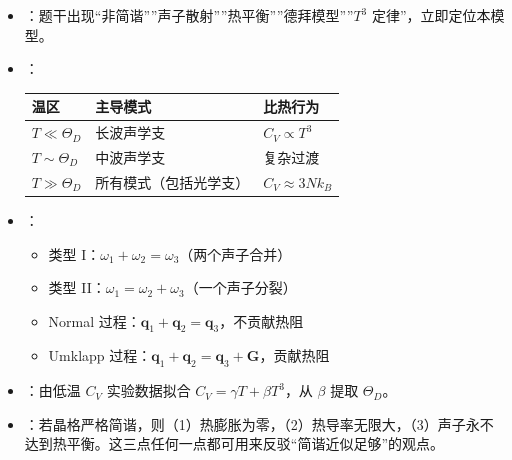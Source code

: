 \begin{tipbox}[快速识别与解题技巧]
\begin{itemize}
    \item {}：题干出现``非简谐''''声子散射''''热平衡''''德拜模型''''$T^3$ 定律''，立即定位本模型。
    \item {}：
    \begin{center}
    \begin{tabular}{lll}
    \toprule
    \textbf{温区} & \textbf{主导模式} & \textbf{比热行为} \\
    \midrule
    $T\ll\Theta_D$ & 长波声学支 & $C_V\propto T^3$ \\
    $T\sim\Theta_D$ & 中波声学支 & 复杂过渡 \\
    $T\gg\Theta_D$ & 所有模式（包括光学支） & $C_V\approx3Nk_B$ \\
    \bottomrule
    \end{tabular}
    \end{center}
    \item {}：
    \begin{itemize}[nosep]
        \item 类型 I：$\omega_1+\omega_2=\omega_3$（两个声子合并）
        \item 类型 II：$\omega_1=\omega_2+\omega_3$（一个声子分裂）
        \item Normal 过程：$\mathbf{q}_1+\mathbf{q}_2=\mathbf{q}_3$，不贡献热阻
        \item Umklapp 过程：$\mathbf{q}_1+\mathbf{q}_2=\mathbf{q}_3+\mathbf{G}$，贡献热阻
    \end{itemize}
    \item {}：由低温 $C_V$ 实验数据拟合 $C_V=\gamma T+\beta T^3$，从 $\beta$ 提取 $\Theta_D$。
    \item {}：若晶格严格简谐，则（1）热膨胀为零，（2）热导率无限大，（3）声子永不达到热平衡。这三点任何一点都可用来反驳``简谐近似足够''的观点。
\end{itemize}
\end{tipbox}

